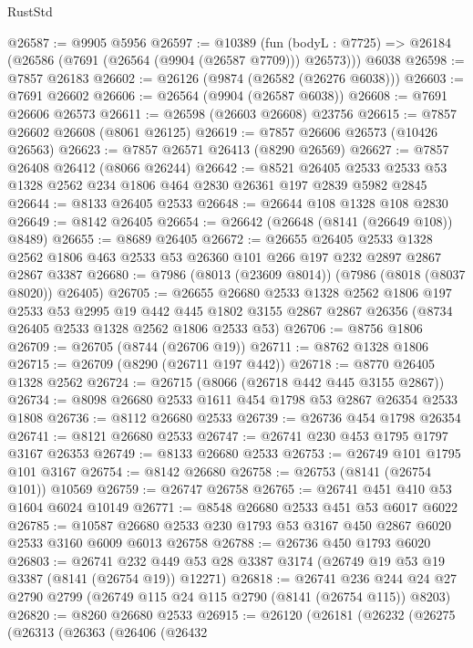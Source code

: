 \begin{lexlean}{RustStd}
\begin{coremodule}
@26587 := @9905 @5956
@26597 := @10389
    (fun (bodyL : @7725) => @26184 (@26586 (@7691 (@26564 (@9904 (@26587 @7709))) @26573)))
    @6038
@26598 := @7857 @26183
@26602 := @26126 (@9874 (@26582 (@26276 @6038)))
@26603 := @7691 @26602
@26606 := @26564 (@9904 (@26587 @6038))
@26608 := @7691 @26606 @26573
@26611 := @26598 (@26603 @26608) @23756
@26615 := @7857 @26602 @26608 (@8061 @26125)
@26619 := @7857 @26606 @26573 (@10426 @26563)
@26623 := @7857 @26571 @26413 (@8290 @26569)
@26627 := @7857 @26408 @26412 (@8066 @26244)
@26642 := @8521
    @26405
    @2533
    @2533
    @53
    @1328
    @2562
    @234
    @1806
    @464
    @2830
    @26361
    @197
    @2839
    @5982
    @2845
@26644 := @8133 @26405 @2533
@26648 := @26644 @108 @1328 @108 @2830
@26649 := @8142 @26405
@26654 := @26642 (@26648 (@8141 (@26649 @108)) @8489)
@26655 := @8689 @26405
@26672 := @26655
    @26405
    @2533
    @1328
    @2562
    @1806
    @463
    @2533
    @53
    @26360
    @101
    @266
    @197
    @232
    @2897
    @2867
    @2867
    @3387
@26680 := @7986 (@8013 (@23609 @8014)) (@7986 (@8018 (@8037 @8020)) @26405)
@26705 := @26655
    @26680
    @2533
    @1328
    @2562
    @1806
    @197
    @2533
    @53
    @2995
    @19
    @442
    @445
    @1802
    @3155
    @2867
    @2867
    @26356
    (@8734 @26405 @2533 @1328 @2562 @1806 @2533 @53)
@26706 := @8756 @1806
@26709 := @26705 (@8744 (@26706 @19))
@26711 := @8762 @1328 @1806
@26715 := @26709 (@8290 (@26711 @197 @442))
@26718 := @8770 @26405 @1328 @2562
@26724 := @26715 (@8066 (@26718 @442 @445 @3155 @2867))
@26734 := @8098 @26680 @2533 @1611 @454 @1798 @53 @2867 @26354 @2533 @1808
@26736 := @8112 @26680 @2533
@26739 := @26736 @454 @1798 @26354
@26741 := @8121 @26680 @2533
@26747 := @26741 @230 @453 @1795 @1797 @3167 @26353
@26749 := @8133 @26680 @2533
@26753 := @26749 @101 @1795 @101 @3167
@26754 := @8142 @26680
@26758 := @26753 (@8141 (@26754 @101)) @10569
@26759 := @26747 @26758
@26765 := @26741 @451 @410 @53 @1604 @6024 @10149
@26771 := @8548 @26680 @2533 @451 @53 @6017 @6022
@26785 := @10587 @26680 @2533 @230 @1793 @53 @3167 @450 @2867 @6020 @2533 @3160 @6009 @6013 @26758
@26788 := @26736 @450 @1793 @6020
@26803 := @26741
    @232
    @449
    @53
    @28
    @3387
    @3174
    (@26749 @19 @53 @19 @3387 (@8141 (@26754 @19)) @12271)
@26818 := @26741
    @236
    @244
    @24
    @27
    @2790
    @2799
    (@26749 @115 @24 @115 @2790 (@8141 (@26754 @115)) @8203)
@26820 := @8260 @26680 @2533
@26915 := @26120
    (@26181
      (@26232
        (@26275
          (@26313
            (@26363
              (@26406
                (@26432

\end{coremodule}
\end{lexlean}
